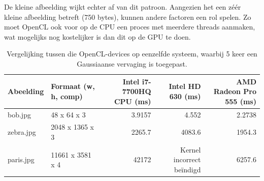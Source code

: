 \documentclass[twocolumn, a4paper]{article}
\begin{document}
De kleine afbeelding wijkt echter af van dit patroon. Aangezien het een zéér kleine afbeelding betreft (750 bytes), kunnen andere factoren een rol spelen. Zo moet OpenCL ook voor op de CPU een proces met meerdere threads aanmaken, wat mogelijks nog kostelijker is dan dit op de GPU te doen. 

\begin{table}[]
    \centering
    \caption{Vergelijking tussen die OpenCL-devices op eenzelfde systeem, waarbij 5 keer een Gaussiaanse vervaging is toegepast.}\label{tab:mes}
    \label{table:measurements}
    \begin{tabular}{@{}llrrr@{}}
        \toprule
        Abeelding & Formaat (w, h, comp) & Intel i7-7700HQ CPU {(}ms{)} & Intel HD 630 {(}ms{)} & AMD Radeon Pro 555 {(}ms{)} \\ \midrule
        bob.jpg   & 48 x 64 x 3              & 3.9157                       & 4.552                 & 2.2738                      \\
        zebra.jpg & 2048 x 1365 x 3      & 2265.7                       & 4083.6                & 1954.3                      \\
        paris.jpg & 11661 x 3581 x 4 & 42172 &Kernel incorrect beïndigd& 6257.6 \\ \bottomrule
    \end{tabular}
\end{table}
\end{document}
